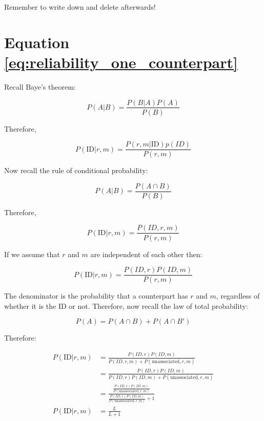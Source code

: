 Remember to write down and delete afterwards!
 
\section{Equation \ref{eq:reliability_one_counterpart}}

Recall Baye's theorem:

\begin{equation*}
    P(A|B) = \frac{P(B|A)P(A)}{P(B)}
\end{equation*}

Therefore,

\begin{equation*}
    P(\textrm{ID}| r, m) = \frac{P(r, m | \textrm{ID}) p(ID)}{P(r, m)}
\end{equation*}

Now recall the rule of conditional probability:

\begin{equation*}
    P(A|B) = \frac{P(A \cap B)}{P(B)}
\end{equation*}

Therefore,

\begin{equation*}
    P(\textrm{ID}| r, m) = \frac{P(ID, r, m)}{P(r, m)}
\end{equation*}

If we assume that $r$ and $m$ are independent of each other then:

\begin{equation*}
    P(\textrm{ID}| r, m) = \frac{P(ID, r) P(ID, m)}{P(r, m)}
\end{equation*}

The denominator is the probability that a counterpart has $r$ and $m$, regardless of whether it is the ID or not. Therefore, now recall the law of total probability:

\begin{equation*}
    P(A) = P(A \cap B) + P(A \cap B')
\end{equation*}

Therefore:

\begin{align*}
    P(\textrm{ID}| r, m) &= \frac{P(ID, r) P(ID, m)}{P(ID, r, m) + P(\textrm{unassociated}, r, m)} \\
    &= \frac{P(ID, r) P(ID, m)}{P(ID, r) P(ID, m) + P(\textrm{unassociated}, r, m)} \\
    &= \frac{\frac{P(ID, r) P(ID, m)}{P(\textrm{unassociated}, r, m)}}{\frac{P(ID, r) P(ID, m)}{P(\textrm{unassociated}, r, m)} + 1} \\
    P(\textrm{ID}| r, m) &= \frac{L}{L + 1}\\
\end{align*}